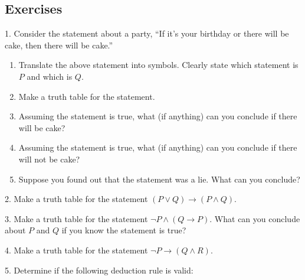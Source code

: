 \documentclass[10pt,]{book}
\theoremstyle{plain}
\theoremstyle{definition}
\theoremstyle{definition}
\theoremstyle{definition}
\numberwithin{equation}{chapter}
\def\imp{\rightarrow}
\begin{document}
\subsection[Exercises]{Exercises}\label{exercises-19}
\begin{exerciselist}
\item[1.]\hypertarget{exercise-220}{}
              Consider the statement about a party, ``If it's your birthday or there will be cake, then there will be cake.''
\leavevmode%
\begin{enumerate}[label=(\alph*)]
\item\hypertarget{li-1045}{}
                  Translate the above statement into symbols. Clearly state which statement is \(P\) and which is \(Q\).
\item\hypertarget{li-1046}{}
                  Make a truth table for the statement.
\item\hypertarget{li-1047}{}
                  Assuming the statement is true, what (if anything) can you conclude if there will be cake?
\item\hypertarget{li-1048}{}
                  Assuming the statement is true, what (if anything) can you conclude if there will not be cake?
\item\hypertarget{li-1049}{}
                  Suppose you found out that the statement was a lie. What can you conclude?
\end{enumerate}
\par\smallskip
\item[2.]\hypertarget{exercise-221}{}
              Make a truth table for the statement \((P \vee Q) \imp (P \wedge Q)\).
\par\smallskip
\item[3.]\hypertarget{exercise-222}{}
              Make a truth table for the statement \(\neg P \wedge (Q \imp P)\). What can you conclude about \(P\) and \(Q\) if you know the statement is true?
\par\smallskip
\item[4.]\hypertarget{exercise-223}{}
              Make a truth table for the statement \(\neg P \imp (Q \wedge R)\).
\par\smallskip
\item[5.]\hypertarget{exercise-224}{}
              Determine if the following deduction rule is valid:
\leavevmode%
\begin{table}

\end{table}
\end{exerciselist}
\end{document}
